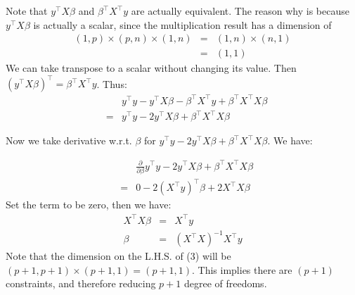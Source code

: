\documentclass{article}
\theoremstyle{MyNonumberplain}
\theoremstyle{break}
\newcommand{\T}{^\intercal}
\theoremstyle{break}
\theoremstyle{break}
\theoremstyle{break}
\begin{document}
\begin{thmbox}
\begin{prfbox}
    Note that $y\T X\beta$ and $\beta\T X\T y$ are actually equivalent. The reason why is because $y\T X\beta$ is actually a scalar, since the multiplication result has a dimension of
    \begin{eqnarray*}
        (1,p) \times (p,n) \times (1,n) &=& (1,n) \times (n,1)\\
                                        &=& (1,1)
    \end{eqnarray*}
    We can take transpose to a scalar without changing its value. Then $(y\T X\beta)\T = \beta\T X\T y$. Thus:
    \begin{eqnarray*}
        & &y\T y - y\T X\beta - \beta\T X\T y + \beta\T X\T X\beta\\
        &=&y\T y - 2y\T X\beta + \beta\T X\T X\beta
    \end{eqnarray*}

    Now we take derivative w.r.t. $\beta$ for $y\T y - 2y\T X\beta + \beta\T X\T X\beta$. We have:


    \end{prfbox}
\end{thmbox} 

\begin{thmbox}
    \begin{prfbox}
        \begin{eqnarray*}
            & &\frac{\partial}{\partial\beta} y\T y - 2y\T X\beta + \beta\T X\T X\beta\\
            &=& 0-2(X\T y)\T\beta+2X\T X\beta
        \end{eqnarray*}   
        Set the term to be zero, then we have:
        \begin{eqnarray}
            X\T X\beta &=& X\T y\\
            \beta &=& (X\T X)^{-1} X\T y
        \end{eqnarray}
        Note that the dimension on the L.H.S. of (3) will be $(p+1,p+1)\times(p+1,1)=(p+1,1)$. This implies there are $(p+1)$ constraints, and therefore reducing $p+1$ degree of freedoms.
    \end{prfbox}
\end{thmbox}
\end{document}
